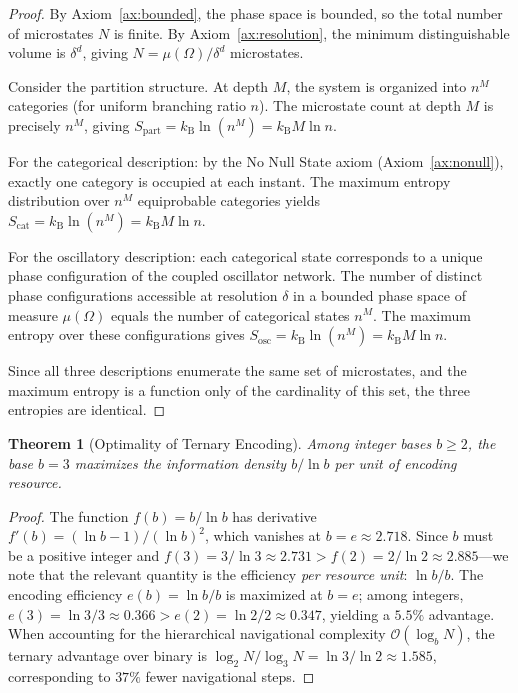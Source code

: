 \documentclass[twocolumn,10pt]{article}
\newtheorem{theorem}{Theorem}[section]
\newcommand{\Sosc}{S_{\mathrm{osc}}}
\newcommand{\Scat}{S_{\mathrm{cat}}}
\newcommand{\Spart}{S_{\mathrm{part}}}
\newcommand{\kB}{k_{\mathrm{B}}}
\begin{document}
\begin{proof}
By Axiom~\ref{ax:bounded}, the phase space is bounded, so the total number of microstates $N$ is finite.  By Axiom~\ref{ax:resolution}, the minimum distinguishable volume is $\delta^{d}$, giving $N = \mu(\Omega)/\delta^{d}$ microstates.

Consider the partition structure.  At depth $M$, the system is organized into $n^{M}$ categories (for uniform branching ratio $n$).  The microstate count at depth $M$ is precisely $n^{M}$, giving $\Spart = \kB \ln(n^{M}) = \kB M \ln n$.

For the categorical description: by the No Null State axiom (Axiom~\ref{ax:nonull}), exactly one category is occupied at each instant.  The maximum entropy distribution over $n^{M}$ equiprobable categories yields $\Scat = \kB \ln(n^{M}) = \kB M \ln n$.

For the oscillatory description: each categorical state corresponds to a unique phase configuration of the coupled oscillator network.  The number of distinct phase configurations accessible at resolution $\delta$ in a bounded phase space of measure $\mu(\Omega)$ equals the number of categorical states $n^{M}$.  The maximum entropy over these configurations gives $\Sosc = \kB \ln(n^{M}) = \kB M \ln n$.

Since all three descriptions enumerate the same set of microstates, and the maximum entropy is a function only of the cardinality of this set, the three entropies are identical.
\end{proof}

\begin{theorem}[Optimality of Ternary Encoding]
\label{thm:ternary}
Among integer bases $b \geq 2$, the base $b = 3$ maximizes the information density $b / \ln b$ per unit of encoding resource.
\end{theorem}

\begin{proof}
The function $f(b) = b / \ln b$ has derivative $f'(b) = (\ln b - 1)/(\ln b)^{2}$, which vanishes at $b = e \approx 2.718$.  Since $b$ must be a positive integer and $f(3) = 3/\ln 3 \approx 2.731 > f(2) = 2/\ln 2 \approx 2.885$---we note that the relevant quantity is the efficiency \emph{per resource unit}: $\ln b / b$.  The encoding efficiency $e(b) = \ln b / b$ is maximized at $b = e$; among integers, $e(3) = \ln 3 / 3 \approx 0.366 > e(2) = \ln 2 / 2 \approx 0.347$, yielding a $5.5\%$ advantage.  When accounting for the hierarchical navigational complexity $\mathcal{O}(\log_{b} N)$, the ternary advantage over binary is $\log_{2} N / \log_{3} N = \ln 3 / \ln 2 \approx 1.585$, corresponding to $37\%$ fewer navigational steps.
\end{proof}
\end{document}
